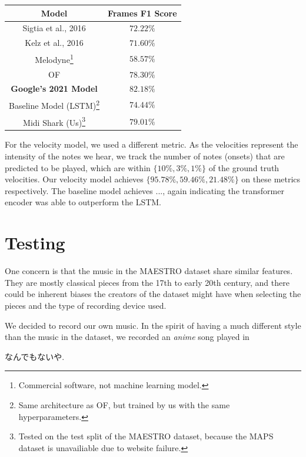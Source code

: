 \documentclass[a4paper,twocolumn,10pt]{article}
\makeatletter
\newcommand\footnoteref[1]{\protected@xdef\@thefnmark{\ref{#1}}\@footnotemark}
\makeatother
\begin{document}
\begin{table}[H]
  \begin{minipage}{\linewidth}
    \centering
    \begin{tabular}{|c|c|}
        \hline
        Model& Frames F1 Score \\
        \hline
        Sigtia et al., 2016 & \(72.22\%\)\\
        \hline
        Kelz et al., 2016 & \(71.60\%\)\\
        \hline
        Melodyne\footnote{Commercial software, not machine learning model.} & \(58.57\%\)\\
        \hline
        OF & \(78.30\%\)\\
        \hline
        \textbf{Google’s 2021 Model} & \(\mathbf{82.18\%}\)\\
        \hline
        Baseline Model (LSTM)\footnote{Same architecture as OF, but trained by us with the same hyperparameters.}\footnoteref{fn:midishark} & \(74.44\%\)\\
        \hline
        Midi Shark (Us)\footnote{\label{fn:midishark}Tested on the test split of the MAESTRO dataset, because the MAPS dataset is unavailiable due to website failure.} & \(79.01\%\)\\
        \hline
    \end{tabular}
  \end{minipage}
\end{table}

For the velocity model, we used a different metric. As the velocities represent the intensity of the notes we hear, we track the number of notes (onsets) that are predicted to be played, which are within \(\{10\%, 3\%, 1\%\}\) of the ground truth velocities. Our velocity model achieves \(\{95.78\%, 59.46\%, 21.48\%\}\) on these metrics respectively. The baseline model achieves ..., again indicating the transformer encoder was able to outperform the LSTM.

\section{Testing}
One concern is that the music in the MAESTRO dataset share similar features. They are mostly classical pieces from the 17th to early 20th century\cite{maestro}, and there could be inherent biases the creators of the dataset might have when selecting the pieces and the type of recording device used.

We decided to record our own music. In the spirit of having a much different style than the music in the dataset, we recorded an \textit{anime} song played in \begin{CJK}{UTF8}{min}なんでもないや.\end{CJK}
\end{document}
